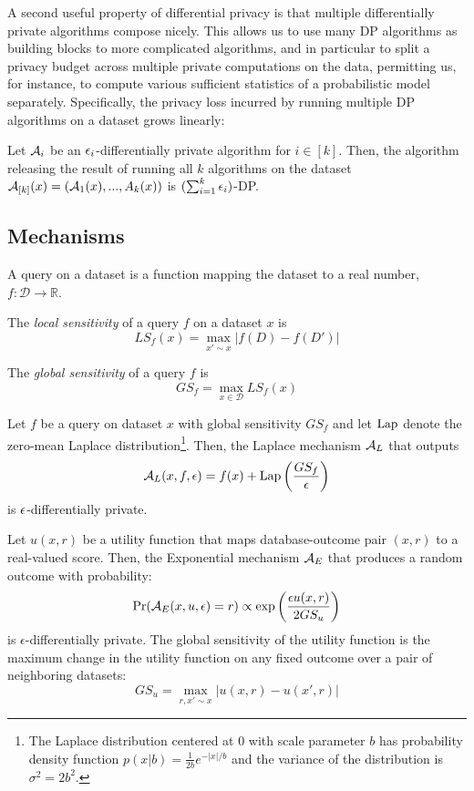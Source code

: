 A second useful property of differential privacy is that multiple differentially private algorithms compose nicely. This allows us to use many DP algorithms as building blocks to more complicated algorithms, and in particular to split a privacy budget across multiple private computations on the data, permitting us, for instance, to compute various sufficient statistics of a probabilistic model separately. Specifically, the privacy loss incurred by running multiple DP algorithms on a dataset grows linearly:
\begin{property}
Let $\mathcal{A}_i$ be an  $\epsilon_i$-differentially private algorithm for $i \in [k]$. Then, the algorithm releasing the result of running all $k$ algorithms on the dataset $\mathcal{A}_{[k]}(x) = (\mathcal{A}_1(x),...,A_k(x))$ is $(\sum_{i=1}^k \epsilon_i)$-DP.
\end{property}

\subsection{Mechanisms}

A query on a dataset is a function mapping the dataset to a real number, $f: \mathcal{D} \to \mathbb{R}$.

\begin{definition}
The \emph{local sensitivity} of a query $f$ on a dataset $x$ is $$LS_f(x) = \max_{x' \sim x} |f(D) - f(D')|$$
\end{definition}

\begin{definition}
The \emph{global sensitivity} of a query $f$ is $$GS_f = \max_{x \in \mathcal{D}} LS_f(x)$$
\end{definition}

\begin{theorem}
	\label{thm:laplace}
	Let $f$ be a query on dataset $x$ with global sensitivity $GS_f$ and let \emph{$\text{Lap}$} denote the zero-mean Laplace distribution\footnote{The Laplace distribution centered at $0$ with scale parameter $b$ has probability density function $p(x | b) = \frac{1}{2b} e^{-|x|/b}$ and the variance of the distribution is $\sigma^2 = 2b^2$.}. Then, the Laplace mechanism $\mathcal{A}_{L}$ that outputs 
	$$\mathcal{A}_L(x, f, \epsilon) = f(x) + \text{Lap}\left(\frac{GS_f}{\epsilon}\right)$$
	is $\epsilon$-differentially private.
\end{theorem}

\begin{theorem}
	Let $u(x,r)$ be a utility function that maps database-outcome pair $(x,r)$ to a real-valued score. Then, the Exponential mechanism $\mathcal{A}_{E}$ that produces a random outcome with probability:
	$$\Pr(\mathcal{A}_E(x, u, \epsilon) = r) \propto \exp \left(\frac{\epsilon u(x,r)}{2 GS_u} \right)$$
	is $\epsilon$-differentially private. The global sensitivity of the utility function is the maximum change in the utility function on any fixed outcome over a pair of neighboring datasets:
	$$GS_u = \max_{r, x' \sim x} |u(x,r) - u(x', r)|$$
\end{theorem}

